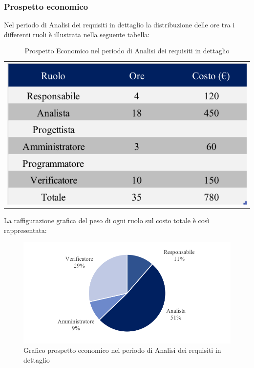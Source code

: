 \newpage
\subsubsection{Prospetto economico}
Nel periodo di Analisi dei requisiti in dettaglio la distribuzione delle ore tra i differenti ruoli è illustrata nella seguente tabella:

\begin{table}[!ht]
	\begin{center}
	\begin{tabular}{c}
	\includegraphics{images/tabellaProspettoEconomicoDett.png}
    \end{tabular}
	\caption{Prospetto Economico nel periodo di Analisi dei requisiti in dettaglio}
	\end{center}
\end{table}

La raffigurazione grafica del peso di ogni ruolo sul costo totale è così rappresentata:
\begin{figure}[!ht]
	\begin{center}
	\includegraphics{images/grafoProspettoEconomicoDett.png}
	\caption{Grafico prospetto economico nel periodo di Analisi dei requisiti in dettaglio }
	\end{center}
\end{figure}